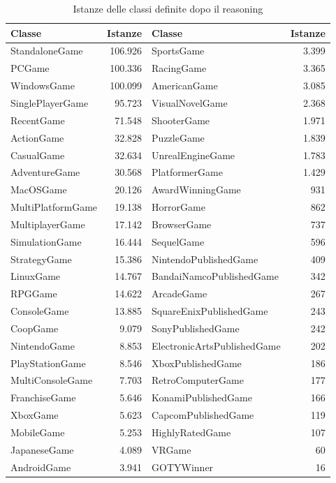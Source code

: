 \begin{table}[h]
\centering
\caption{Istanze delle classi definite dopo il reasoning}
\label{tab:inferite}
\footnotesize
\begin{tabular}{lrlr}
\toprule
\textbf{Classe} & \textbf{Istanze} & \textbf{Classe} & \textbf{Istanze} \\
\midrule
StandaloneGame & 106.926 & SportsGame & 3.399 \\
PCGame & 100.336 & RacingGame & 3.365 \\
WindowsGame & 100.099 & AmericanGame & 3.085 \\
SinglePlayerGame & 95.723 & VisualNovelGame & 2.368 \\
RecentGame & 71.548 & ShooterGame & 1.971 \\
ActionGame & 32.828 & PuzzleGame & 1.839 \\
CasualGame & 32.634 & UnrealEngineGame & 1.783 \\
AdventureGame & 30.568 & PlatformerGame & 1.429 \\
MacOSGame & 20.126 & AwardWinningGame & 931 \\
MultiPlatformGame & 19.138 & HorrorGame & 862 \\
MultiplayerGame & 17.142 & BrowserGame & 737 \\
SimulationGame & 16.444 & SequelGame & 596 \\
StrategyGame & 15.386 & NintendoPublishedGame & 409 \\
LinuxGame & 14.767 & BandaiNamcoPublishedGame & 342 \\
RPGGame & 14.622 & ArcadeGame & 267 \\
ConsoleGame & 13.885 & SquareEnixPublishedGame & 243 \\
CoopGame & 9.079 & SonyPublishedGame & 242 \\
NintendoGame & 8.853 & ElectronicArtsPublishedGame & 202 \\
PlayStationGame & 8.546 & XboxPublishedGame & 186 \\
MultiConsoleGame & 7.703 & RetroComputerGame & 177 \\
FranchiseGame & 5.646 & KonamiPublishedGame & 166 \\
XboxGame & 5.623 & CapcomPublishedGame & 119 \\
MobileGame & 5.253 & HighlyRatedGame & 107 \\
JapaneseGame & 4.089 & VRGame & 60 \\
AndroidGame & 3.941 & GOTYWinner & 16 \\
\bottomrule
\end{tabular}
\end{table}

